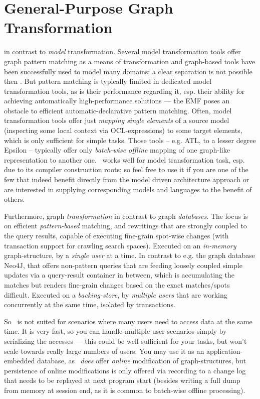 \section{General-Purpose Graph Transformation}
in contrast to \emph{model} transformation.
Several model transformation tools offer graph pattern matching as a means of transformation and graph-based tools have been successfully used to model many domains; a clear separation is not possible then \cite{Jakumeit2013}.
But pattern matching is typically limited in dedicated model transformation tools, as is their performance regarding it, esp. their ability for achieving automatically high-performance solutions --- the EMF poses an obstacle to efficient automatic-declarative pattern matching.
Often, model transformation tools offer just \emph{mapping single elements} of a source model (inspecting some local context via OCL-expressions) to some target elements, which is only sufficient for simple tasks.
Those tools -- e.g. ATL\cite{atl}, to a lesser degree Epsilon\cite{epsilon} -- typically offer only \emph{batch-wise offline} mapping of one graph-like representation to another one.
\GrG\ works well for model transformation task, esp. due to its compiler construction roots; so feel free to use it if you are one of the few that indeed benefit directly from the model driven architecture approach or are interested in supplying corresponding models and languages to the benefit of others. 

Furthermore, graph \emph{transformation} in contrast to graph \emph{databases}.
The focus is on efficient \emph{pattern-based} matching, and rewritings that are strongly coupled to the query results, capable of executing fine-grain spot-wise changes (with transaction support for crawling search spaces). 
Executed on an \emph{in-memory} graph-structure, by a \emph{single user} at a time.
In contrast to e.g. the graph database Neo4J\cite{neo}, that offers non-pattern queries that are feeding loosely coupled simple updates via a query-result container in between, which is accumulating the matches but renders fine-grain changes based on the exact matches/spots difficult.
Executed on a \emph{backing-store}, by \emph{multiple users} that are working concurrently at the same time, isolated by transactions.

So \GrG\ is not suited for scenarios where many users need to access data at the same time. 
It is very fast, so you can handle multiple-user scenarios simply by serializing the accesses --- this could be well sufficient for your tasks, but won't scale towards really large numbers of users.
You may use it as an application-embedded database, as
\GrG\ \emph{does} offer \emph{online} modification of graph-structures,
but persistence of online modifications is only offered via recording to a change log that needs to be replayed at next program start
(besides writing a full dump from memory at session end, as it is common to batch-wise offline processing).

